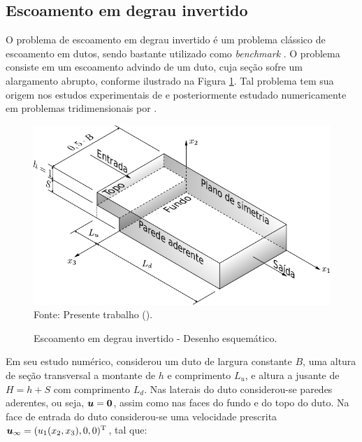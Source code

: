 \subsection{Escoamento em degrau invertido} \label{ex:backwardFacingStep}

O problema de escoamento em degrau invertido é um problema clássico de escoamento em dutos, sendo bastante utilizado como \textit{benchmark} \cite{armaly1983experimental,chiang1999numerical}. O problema consiste em um escoamento advindo de um duto, cuja seção sofre um alargamento abrupto, conforme ilustrado na Figura \ref{fig:step}. Tal problema tem sua origem nos estudos experimentais de  e posteriormente estudado numericamente em problemas tridimensionais por .

\begin{figure}[h!]
    \centering
    \caption{Escoamento em degrau invertido - Desenho esquemático.}
    \includegraphics[width=.7\linewidth]{Figuras/backwardFacingStep/backwardFacingStep.pdf}
    \\Fonte: Presente trabalho (\the\year).
    \label{fig:step}
\end{figure}

Em seu estudo numérico,  considerou um duto de largura constante $B$, uma altura de seção transversal a montante de $h$ e comprimento $L_u$, e altura a jusante de $H=h+S$ com comprimento $L_d$. Nas laterais do duto considerou-se paredes aderentes, ou seja, $\boldsymbol{u}=\boldsymbol{0}$, assim como nas faces do fundo e do topo do duto. Na face de entrada do duto considerou-se uma velocidade prescrita $\boldsymbol{u}_\infty=(u_1(x_2,x_3),0,0)^\mathrm{T}$, tal que:

